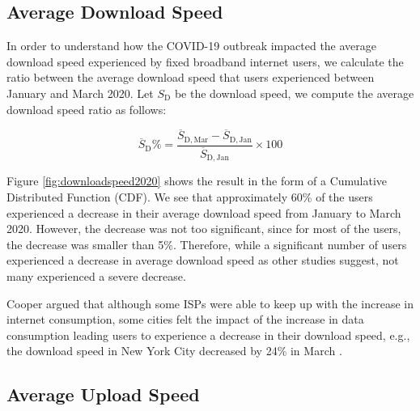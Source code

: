\documentclass[conference,10pt]{IEEEtran}
\begin{document}
\subsection{Average Download Speed}
\label{sec:average-download-speed}

In order to understand how the COVID-19 outbreak impacted the average download speed experienced by fixed broadband internet users, we calculate the ratio between the average download speed that users experienced between January and March 2020. Let $S_{\text{D}}$ be the download speed, we compute the average download speed ratio as follows:

\begin{equation}
\overline{S}_{\text{D}}\% = \frac{\overline{S}_{\text{D},\, \text{Mar}}-\overline{S}_{\text{D},\, \text{Jan}}}{\overline{S}_{\text{D},\, \text{Jan}}}\times 100
\end{equation}


Figure \ref{fig:downloadspeed2020} shows the result in the form of a Cumulative Distributed Function (CDF). We see that approximately 60\% of the users experienced a decrease in their average download speed from January to March 2020. However, the decrease was not too significant, since for most of the users, the decrease was smaller than 5\%. Therefore, while a significant number of users experienced a decrease in average download speed as other studies suggest, not many experienced a severe decrease.

Cooper argued that although some ISPs were able to keep up with the increase in internet consumption, some cities felt the impact of the increase in data consumption leading users to experience a decrease in their download speed, e.g., the download speed in New York City decreased by 24\% in March \cite{cooper}.


\subsection{Average Upload Speed}
\label{sec:average-upload-speed}
\end{document}
